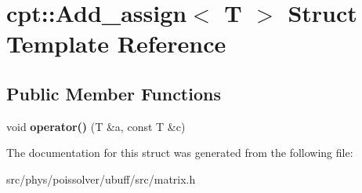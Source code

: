 \hypertarget{structcpt_1_1Add__assign}{}\section{cpt\+:\+:Add\+\_\+assign$<$ T $>$ Struct Template Reference}
\label{structcpt_1_1Add__assign}
\subsection*{Public Member Functions}
\begin{DoxyCompactItemize}
\item 
void {\bfseries operator()} (T \&a, const T \&c)\hypertarget{structcpt_1_1Add__assign_a15880580d33084f5844398d00762621e}{}\label{structcpt_1_1Add__assign_a15880580d33084f5844398d00762621e}

\end{DoxyCompactItemize}


The documentation for this struct was generated from the following file\+:\begin{DoxyCompactItemize}
\item 
src/phys/poissolver/ubuff/src/matrix.\+h\end{DoxyCompactItemize}
